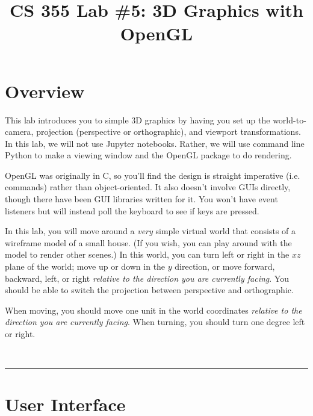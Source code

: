\documentclass[11pt]{article}
\title{\vspace{-0.5in}CS 355 Lab \#5: 3D Graphics with OpenGL}
\date{\vspace{-0.25in}}
\newif\ifinstructor
\begin{document}
\maketitle

\newcommand{\mat}[1]{\mathbf #1}
\renewcommand{\vec}[1]{\mathbf #1}
\newcommand{\x}{\vec{x}}
\newcommand{\y}{\vec{y}}
\newcommand{\p}{\vec{p}}
\renewcommand{\c}{\vec{c}}

\newcommand{\note}[1]{\textcolor{red}{NOTE: #1}}
\newcommand{\divider}{\bigskip ~ \hrule}

\vspace{-0.5in}

\ifinstructor
Time to complete: 1 week ramp-up plus 1 week to actually do.
\fi

\section*{Overview}

This lab introduces you to simple 3D graphics by having you set up the world-to-camera, projection (perspective or orthographic), and viewport transformations. In this lab, we will not use Jupyter notebooks. Rather, we will use command line Python to make a viewing window and the OpenGL package to do rendering.

OpenGL was originally in C, so you'll find the design is straight imperative (i.e. commands) rather than object-oriented. It also doesn't involve GUIs directly, though there have been GUI libraries written for it. You won't have event listeners but will instead poll the keyboard to see if keys are pressed.

In this lab, you will move around a \textit{very} simple virtual world that consists of a wireframe model of a small house. (If you wish, you can play around with the model to render other scenes.) In this world, you can turn left or right in the $xz$ plane of the world; move up or down in the $y$ direction, or move forward, backward, left, or right \textit{relative to the direction you are currently facing}. You should be able to switch the projection between perspective and orthographic.

When moving, you should move one unit in the world coordinates \textit{relative to the direction you are currently facing}. When turning, you should turn one degree left or right.

\divider

\section*{User Interface}
\end{document}
